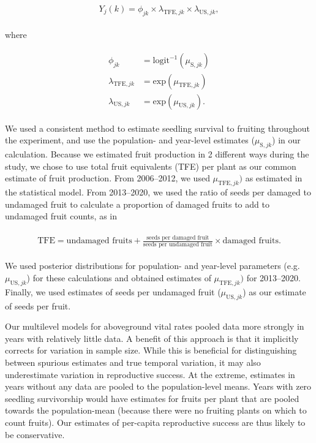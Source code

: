 \documentclass[12pt, oneside, titlepage]{article}   	%
\begin{document}
{\begin{align}
  \begin{split}
Y_{j}(k) = \phi_{jk} \times \lambda_{\mathrm{TFE},jk} \times \lambda_{\mathrm{US},jk}, \label{eq:percapitars}
  \end{split}
\end{align}

where

\begin{align}
  \begin{split}
\phi_{jk} & = \mathrm{logit}^{-1}(\mu_{\mathrm{S},jk}) \\
\lambda_{\mathrm{TFE},jk} & = \mathrm{exp}(\mu_{\mathrm{TFE},jk}) \\
\lambda_{\mathrm{US},jk} & = \mathrm{exp}(\mu_{\mathrm{US},jk}). 
  \end{split}
\end{align}

We used a consistent method to estimate seedling survival to fruiting throughout the experiment, and use the population- and year-level estimates ($\mu_{\mathrm{S},jk}$) in our calculation. Because we estimated fruit production in 2 different ways during the study, we chose to use total fruit equivalents (TFE) per plant as our common estimate of fruit production. From 2006--2012, we used $\mu_{\mathrm{TFE},jk})$ as estimated in the statistical model. From 2013--2020, we used the ratio of seeds per damaged to undamaged fruit to calculate a proportion of damaged fruits to add to undamaged fruit counts, as in 

\begin{align}
\begin{split}
\textrm{TFE} = \textrm{undamaged fruits} + \frac{\textrm{seeds per damaged fruit}}{\textrm{seeds per undamaged fruit}}\times  \textrm{damaged fruits} .
  \end{split}
\end{align}

We used posterior distributions for population- and year-level parameters (e.g. $\mu_{\mathrm{US},jk}$) for these calculations and obtained estimates of $\mu_{\mathrm{TFE},jk})$ for 2013--2020. Finally, we used estimates of seeds per undamaged fruit ($\mu_{\mathrm{US},jk}$) as our estimate of seeds per fruit.

Our multilevel models for aboveground vital rates pooled data more strongly in years with relatively little data. A benefit of this approach is that it implicitly corrects for variation in sample size. While this is beneficial for distinguishing between spurious estimates and true temporal variation, it may also underestimate variation in reproductive success. At the extreme, estimates in years without any data are pooled to the population-level means. Years with zero seedling survivorship would have estimates for fruits per plant that are pooled towards the population-mean (because there were no fruiting plants on which to count fruits). Our estimates of per-capita reproductive success are thus likely to be conservative. 

}
\end{document}
